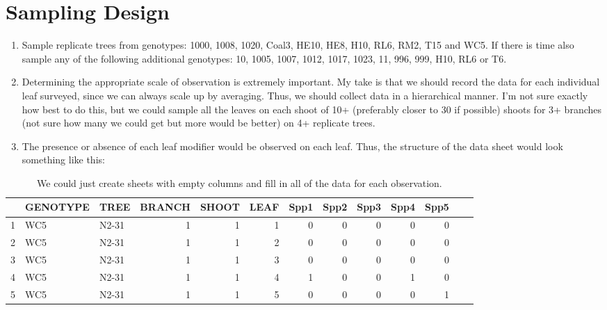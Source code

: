 \documentclass[11pt]{amsart}
\begin{document}
\section{Sampling Design}

\begin{enumerate}
\item Sample replicate trees from genotypes: 1000, 1008, 1020, Coal3, HE10, HE8, H10, RL6, RM2, T15 and WC5. If there is time also sample any of the following additional genotypes: 10, 1005, 1007, 1012, 1017, 1023, 11, 996, 999, H10, RL6 or T6.
\item Determining the appropriate scale of observation is extremely important. My take is that we should record the data for each individual leaf surveyed, since we can always scale up by averaging. Thus, we should collect data in a hierarchical manner. I'm not sure exactly how best to do this, but we could sample all the leaves on each shoot of 10+ (preferably closer to 30 if possible) shoots for 3+ branches (not sure how many we could get but more would be better) on 4+ replicate trees. 
\item The presence or absence of each leaf modifier would be observed on each leaf. Thus, the structure of the data sheet would look something like this:
\end{enumerate}

\begin{table}[ht]
\begin{center}
\begin{tabular}{rllrrrrrrrrrr}
  \hline
 & GENOTYPE & TREE & BRANCH & SHOOT & LEAF & Spp1 & Spp2 & Spp3 & Spp4 & Spp5  \\ 
  \hline
1 & WC5 & N2-31 & 1 & 1 &   1 & 0 & 0 & 0 & 0 & 0 \\ 
  2 & WC5 & N2-31 & 1 & 1 &   2 & 0 & 0 & 0 & 0 & 0 \\ 
  3 & WC5 & N2-31 & 1 & 1 &   3 & 0 & 0 & 0 & 0 & 0 \\ 
  4 & WC5 & N2-31 & 1 & 1 &   4 & 1 & 0 & 0 & 1 & 0 \\ 
  5 & WC5 & N2-31 & 1 & 1 &   5 & 0 & 0 & 0 & 0 & 1 \\ 
   \hline
\end{tabular}
\vspace{0.5cm}
\caption{We could just create sheets with empty columns and fill in all of the data for each observation.}
\end{center}
\end{table}
\end{document}
